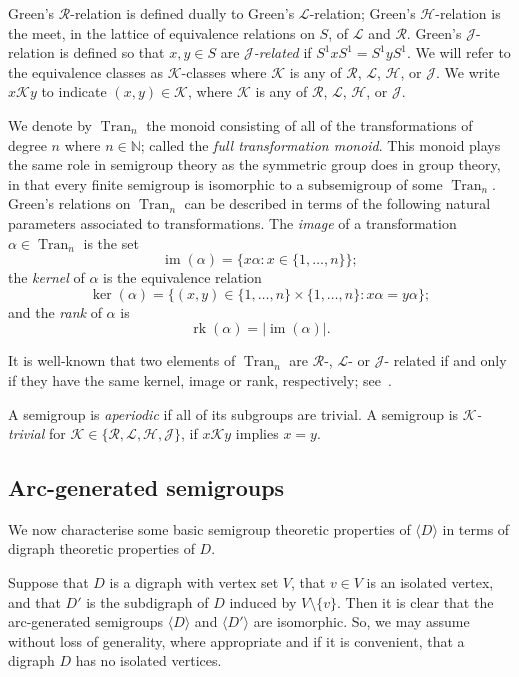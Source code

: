 \documentclass[ALCO,ThmDefs,Unicode,epreuves]{cedram}
\newcommand{\N}{\mathbb{N}}
\DeclareMathOperator{\im}{im}
\DeclareMathOperator{\Tran}{Tran}
\DeclareMathOperator{\rk}{rk}
\newcommand{\genset}[1]{\langle#1\rangle}
\newcommand{\set}[2]{\{#1:#2\}}
\newcommand{\LL}{\mathcal{L}}
\newcommand{\R}{\mathcal{R}}
\newcommand{\J}{\mathcal{J}}
\newcommand{\K}{\mathcal{K}}
\newcommand{\Hcal}{\mathcal{H}}
\begin{document}
Green's $\R$-relation is defined dually to Green's $\LL$-relation; Green's
$\Hcal$-relation is the meet, in the lattice of equivalence relations on $S$, of
$\LL$ and $\R$. Green's $\J$-relation is defined so that $x,y \in S$ are
\emph{$\J$-related} if $S ^ 1 x S ^ 1 = S^1 y S ^ 1$. We will refer to the
equivalence classes as $\K$-classes where $\K$ is any of
$\R$, $\LL$, $\Hcal$, or $\J$. We write $x\K y$ to indicate $(x, y) \in \K$, where
$\K$ is any of $\R$, $\LL$, $\Hcal$, or $\J$.

We denote by $\Tran_n$ the monoid consisting of all of the transformations of
degree $n$ where $n\in \N$; called the \emph{full transformation monoid}.
This monoid plays the same role in semigroup theory as the symmetric group does
in group theory, in that every finite semigroup is isomorphic to a subsemigroup
of some $\Tran_n$. Green's relations on $\Tran_n$ can be described in terms of
the following natural parameters associated to transformations. The
\emph{image} of a transformation $\alpha\in \Tran_n$ is the set
\[\im(\alpha)=\set{x\alpha}{x\in\{1, \ldots, n\}};\]
the \emph{kernel} of $\alpha$ is the equivalence relation
\[\ker(\alpha)=\set{(x,y)\in\{1, \ldots, n\}\times\{1, \ldots,
n\}}{x\alpha=y\alpha};\]
and the \emph{rank} of $\alpha$ is
\[\rk(\alpha)=|\im(\alpha)|.\]

It is well-known that two elements of $\Tran_n$ are $\R$-, $\LL$- or $\J$-
related if and only if they have the same kernel, image or rank, respectively;
see~\cite[Exercise~2.6.16]{Howie1995aa}.

A semigroup is \emph{aperiodic} if all of its subgroups are trivial. A
semigroup is \emph{$\K$-trivial} for $\K \in \{\R, \LL, \Hcal,
\J\}$, if $x\K y$ implies $x = y$. 


\subsection{Arc-generated semigroups}

We now characterise some basic semigroup theoretic properties of
$\genset{D}$ in terms of digraph theoretic properties of $D$.

Suppose that $D$ is a digraph with vertex set $V$, that $v\in V$ is an isolated
vertex, and that $D'$ is the subdigraph of $D$ induced by $V\setminus \{v\}$.
Then it is clear that the arc-generated semigroups $\genset{D}$ and
$\genset{D'}$ are isomorphic. So, we may assume without loss of generality,
where appropriate and if it is convenient, that a digraph $D$ has no isolated
vertices.
\end{document}
